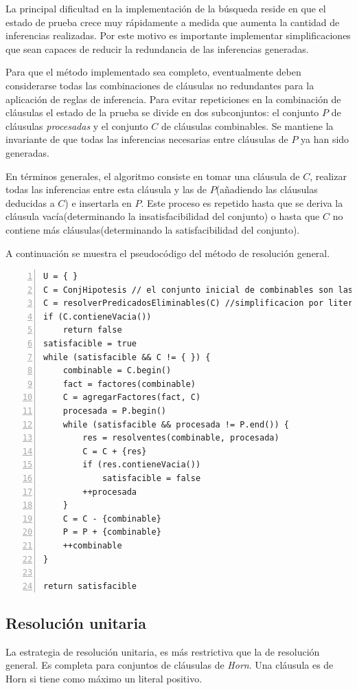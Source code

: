 \documentclass[a4paper,12pt]{article}
\begin{document}
La principal dificultad en la implementación de la búsqueda reside en que el estado de prueba crece
muy rápidamente a medida que aumenta la cantidad de inferencias realizadas. Por este motivo es importante
implementar simplificaciones que sean capaces de reducir la redundancia de las inferencias generadas.

Para que el método implementado sea completo, eventualmente deben considerarse todas las combinaciones
de cláusulas no redundantes para la aplicación de reglas de inferencia. Para evitar repeticiones en
la combinación de cláusulas el estado de la prueba se divide en dos subconjuntos: el conjunto $P$ de
cláusulas \emph{procesadas} y el conjunto $C$ de cláusulas combinables. Se mantiene la invariante de que
todas las inferencias necesarias entre cláusulas de $P$ ya han sido generadas.

En términos generales, el algoritmo consiste en tomar una cláusula de $C$, realizar todas las inferencias
entre esta cláusula y las de $P$(añadiendo las cláusulas deducidas a $C$) e insertarla en $P$. Este proceso
es repetido hasta que se deriva la cláusula vacía(determinando la insatisfacibilidad del conjunto) o hasta
que $C$ no contiene más cláusulas(determinando la satisfacibilidad del conjunto).

A continuación se muestra el pseudocódigo del método de resolución general.
\begin{lstlisting}[caption=esSatisfacible, frame=single, numbers=left, basicstyle=\tiny]
U = { }
C = ConjHipotesis // el conjunto inicial de combinables son las hipotesis
C = resolverPredicadosEliminables(C) //simplificacion por literales eliminables
if (C.contieneVacia())
    return false
satisfacible = true
while (satisfacible && C != { }) {
    combinable = C.begin()
    fact = factores(combinable)
    C = agregarFactores(fact, C)
    procesada = P.begin()
    while (satisfacible && procesada != P.end()) {
        res = resolventes(combinable, procesada)
        C = C + {res}
        if (res.contieneVacia())
            satisfacible = false
        ++procesada
    }
    C = C - {combinable}
    P = P + {combinable}
    ++combinable
}

return satisfacible
\end{lstlisting}
\subsection{Resolución unitaria}
La estrategia de resolución unitaria, es más restrictiva que la de resolución general. Es completa
para conjuntos de cláusulas de \emph{Horn}. Una cláusula es de Horn si tiene como máximo un literal
positivo.
\end{document}
